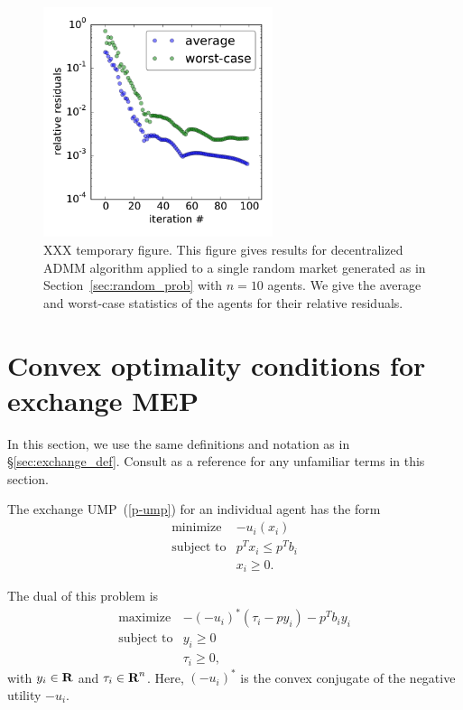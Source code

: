 \documentclass[12pt]{article}
\begin{document}
\begin{figure}
\begin{center}
\includegraphics[width=0.6\textwidth]{figures/admm}
\end{center}
\caption{XXX temporary figure. This figure gives results for decentralized ADMM algorithm applied to a single random market generated as in Section~\ref{sec:random_prob} with $n=10$ agents. We give the average and worst-case statistics of the agents for their relative residuals.}
\label{f-admm}
\end{figure}


\appendix


\section{Convex optimality conditions for exchange MEP}
\label{sec:exchange_proof}
In this section, we use the same definitions and notation as in \S\ref{sec:exchange_def}.
Consult \cite{BoV:04} as a reference for any unfamiliar terms in this section.

The exchange UMP~(\ref{p-ump}) for an individual agent has the form
\[
\begin{array}{ll}
\mbox{minimize} & - u_i(x_i)\\
\mbox{subject to} & p^T x_i \leq p^T b_i\\
& x_i \geq 0.
\end{array}
\]

The dual of this problem is
\[
\begin{array}{ll}
\mbox{maximize} & -(- u_i)^*(\tau_i - p y_i) - p^T b_i y_i\\
\mbox{subject to} & y_i \geq 0\\
& \tau_i \geq 0,
\end{array}
\]
with $y_i \in {\mbox{\bf R}}$ and $\tau_i \in {\mbox{\bf R}}^n$. Here, $(- u_i)^*$
is the convex conjugate of the negative utility $-u_i$.
\end{document}
